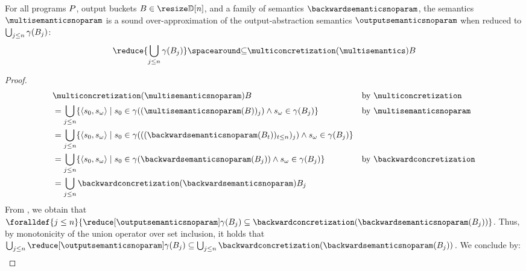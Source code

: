 \begin{lemma}
  For all programs $P$, output buckets $\buckets\in\vectorbuckets$, and a family of semantics $\backwardsemanticsnoparam$, the %
  semantics $\multisemanticsnoparam$ is a \textup{sound over-approximation} of the output-abstraction semantics $\outputsemanticsnoparam$ when reduced to $\bigcup_{j\le n}\gamma({B}_{j})$:
  \[\reduce{\bigsetjoin\limits_{j\le n}\abstractdomainconcretization(\bucket)} \SubseteQ \multiconcretization(\multisemantics)\buckets\]
\end{lemma}
\begin{proof}
  \begin{align*}
    &\vphantom{=} \multiconcretization(\multisemanticsnoparam)\buckets
      && \text{by $\multiconcretization$} \\
    &= \bigsetjoin_{j \le n}\setdef{\inputoutputtuple{\defstate}}{\retrieveinput{\defstate}\in\abstractdomainconcretization((\multisemanticsnoparam(\buckets))_j)\land\retrieveoutput{\defstate}\in\abstractdomainconcretization(\bucket)}
      && \text{by $\multisemanticsnoparam$} \\
    &= \bigsetjoin_{j \le n} \setdef{\inputoutputtuple{\defstate}}{\retrieveinput{\defstate}\in\abstractdomainconcretization(((\backwardsemanticsnoparam(\bucket[t]))_{t\le n})_j)\land\retrieveoutput{\defstate}\in\abstractdomainconcretization(\bucket)}
    && \\
    &= \bigsetjoin_{j \le n} \setdef{\inputoutputtuple{\defstate}}{\retrieveinput{\defstate}\in\abstractdomainconcretization(\backwardsemanticsnoparam(\bucket))\land\retrieveoutput{\defstate}\in\abstractdomainconcretization(\bucket)}
    && \text{by $\backwardconcretization$} \\
    &= \bigsetjoin_{j \le n} \backwardconcretization(\backwardsemanticsnoparam)\bucket
  \end{align*}
  From , we obtain that $\foralldef{j \le n}{\reducedoutputsemanticsnoparam \subseteq \backwardconcretization(\backwardsemanticsnoparam(\bucket))}$.
  Thus, by monotonicity of the union operator over set inclusion, it holds that $\bigsetjoin_{j\le n}\reducedoutputsemanticsnoparam \subseteq \bigsetjoin_{j\le n}\backwardconcretization(\backwardsemanticsnoparam(\bucket))$. We conclude by:
  \begin{align*}

\end{align*}
\end{proof}

